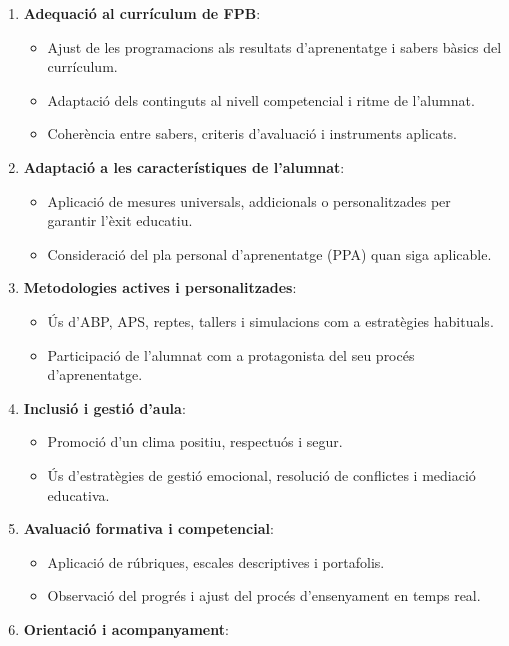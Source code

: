 \documentclass[
  paper=a4,
  ,captions=tableheading
]{scrartcl}
\providecommand{\tightlist}{%
  \setlength{\itemsep}{0pt}\setlength{\parskip}{0pt}}
\begin{document}
\begin{enumerate}
\def\labelenumi{\arabic{enumi}.}
\item
  \textbf{Adequació al currículum de FPB}:

  \begin{itemize}
  \tightlist
  \item
    Ajust de les programacions als resultats d'aprenentatge i sabers
    bàsics del currículum.
  \item
    Adaptació dels continguts al nivell competencial i ritme de
    l'alumnat.
  \item
    Coherència entre sabers, criteris d'avaluació i instruments
    aplicats.
  \end{itemize}
\item
  \textbf{Adaptació a les característiques de l'alumnat}:

  \begin{itemize}
  \tightlist
  \item
    Aplicació de mesures universals, addicionals o personalitzades per
    garantir l'èxit educatiu.
  \item
    Consideració del pla personal d'aprenentatge (PPA) quan siga
    aplicable.
  \end{itemize}
\item
  \textbf{Metodologies actives i personalitzades}:

  \begin{itemize}
  \tightlist
  \item
    Ús d'ABP, APS, reptes, tallers i simulacions com a estratègies
    habituals.
  \item
    Participació de l'alumnat com a protagonista del seu procés
    d'aprenentatge.
  \end{itemize}
\item
  \textbf{Inclusió i gestió d'aula}:

  \begin{itemize}
  \tightlist
  \item
    Promoció d'un clima positiu, respectuós i segur.
  \item
    Ús d'estratègies de gestió emocional, resolució de conflictes i
    mediació educativa.
  \end{itemize}
\item
  \textbf{Avaluació formativa i competencial}:

  \begin{itemize}
  \tightlist
  \item
    Aplicació de rúbriques, escales descriptives i portafolis.
  \item
    Observació del progrés i ajust del procés d'ensenyament en temps
    real.
  \end{itemize}
\item
  \textbf{Orientació i acompanyament}:


\end{enumerate}
\end{document}
